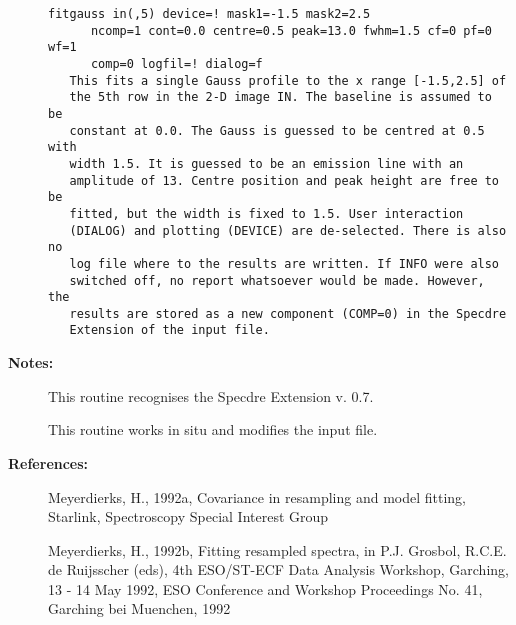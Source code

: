 \begin{description}
\begin{verbatim}
fitgauss in(,5) device=! mask1=-1.5 mask2=2.5
      ncomp=1 cont=0.0 centre=0.5 peak=13.0 fwhm=1.5 cf=0 pf=0 wf=1
      comp=0 logfil=! dialog=f
   This fits a single Gauss profile to the x range [-1.5,2.5] of
   the 5th row in the 2-D image IN. The baseline is assumed to be
   constant at 0.0. The Gauss is guessed to be centred at 0.5 with
   width 1.5. It is guessed to be an emission line with an
   amplitude of 13. Centre position and peak height are free to be
   fitted, but the width is fixed to 1.5. User interaction
   (DIALOG) and plotting (DEVICE) are de-selected. There is also no
   log file where to the results are written. If INFO were also
   switched off, no report whatsoever would be made. However, the
   results are stored as a new component (COMP=0) in the Specdre
   Extension of the input file.
\end{verbatim}

\item [{\bf Notes:}]
This routine recognises the Specdre Extension v. 0.7.

This routine works in situ and modifies the input file.

\item [{\bf References:}]
   Meyerdierks, H., 1992a, Covariance in resampling and model fitting,
   Starlink, Spectroscopy Special Interest Group

   Meyerdierks, H., 1992b, Fitting resampled spectra, in P.J.
   Grosbol, R.C.E. de Ruijsscher (eds), 4th ESO/ST-ECF Data Analysis
   Workshop, Garching, 13 - 14 May 1992, ESO Conference and Workshop
   Proceedings No. 41, Garching bei Muenchen, 1992
\end{description}
